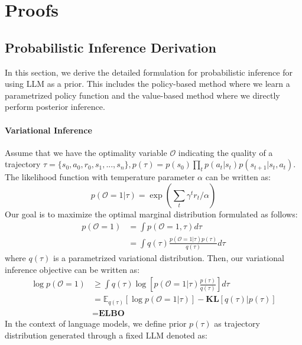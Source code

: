 \section{Proofs}

\subsection{Probabilistic Inference Derivation}\label{appendix: probabilistic}
In this section, we derive the detailed formulation for probabilistic inference for using LLM as a prior. This includes the policy-based method where we learn a parametrized policy function and the value-based method where we directly perform posterior inference.

\paragraph{Variational Inference}
 Assume that we have the optimality variable $\mathcal{O}$ indicating the quality of a trajectory $\tau = \{s_0, a_0, r_0, s_{1}, ..., s_n \}, p(\tau) = p(s_0)\prod_t p(a_t|s_t)p(s_{t+1}|s_t, a_t)$. The likelihood function with temperature parameter $\alpha$ can be written as:
\begin{equation}
    p(\mathcal{O}=1|\tau) = \exp \left(\sum_t \gamma^tr_t/\alpha \right)
\end{equation}
Our goal is to maximize the optimal marginal distribution formulated as follows:
\begin{equation}
\begin{aligned}
    p(\mathcal{O}=1) & =  \int p(\mathcal{O}=1, \tau) d\tau \\
    & = \int q(\tau) \frac{p(\mathcal{O}=1|\tau)p(\tau)}{q(\tau)} d\tau 
\end{aligned}
\end{equation}
where $q(\tau)$ is a parametrized variational distribution. Then, our variational inference objective can be written as:
\begin{equation}
\begin{aligned}
\log p(\mathcal{O}=1) & \geq \int q(\tau) \log \left[p(\mathcal{O}=1|\tau) \frac{p(\tau)}{q(\tau)} \right] d\tau \\
& = \mathbb{E}_{q(\tau)}\left[\log p(\mathcal{O}=1|\tau) \right] - \textbf{KL}\left[q(\tau) | p(\tau)\right] \\
& = \textbf{ELBO}
\end{aligned}
\end{equation}
In the context of language models, we define prior $p(\tau)$ as trajectory distribution generated through a fixed LLM denoted as:
